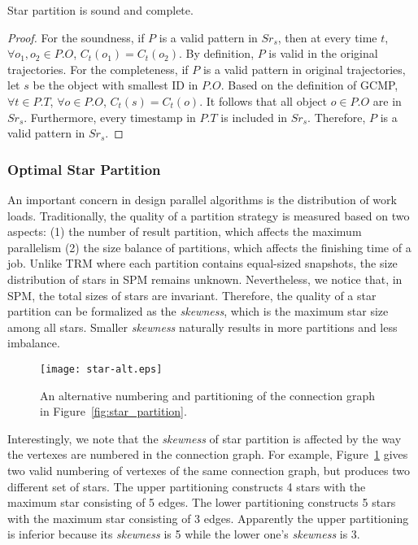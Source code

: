 \begin{theorem}
Star partition is sound and complete.
\end{theorem}

\begin{proof}
For the soundness,
if $P$ is a valid pattern in $Sr_s$, then at every time $t$, 
$\forall o_1, o_2 \in P.O$, $C_t(o_1) = C_t(o_2)$.
By definition, $P$ is valid in the original trajectories.
For the completeness,
if $P$ is a valid pattern in original trajectories, 
let $s$ be the object with smallest ID in $P.O$. 
Based on the definition of GCMP, $\forall t \in P.T$, $\forall o \in P.O$, $C_t(s) = C_t(o)$.
It follows that all object $o \in P.O$ are in $Sr_s$. 
Furthermore, every timestamp in $P.T$ is included
in $Sr_s$. Therefore, $P$ is a valid pattern in $Sr_s$.
\end{proof}


\subsubsection{Optimal Star Partition}
An important concern in design parallel algorithms is 
the distribution of work loads.  
Traditionally, the quality of a partition strategy 
is measured based on two aspects: (1) the number of result partition, which
affects the maximum parallelism
(2) the size balance of partitions, which affects the finishing
time of a job. Unlike TRM where each partition
contains equal-sized snapshots, the size distribution 
of stars in SPM remains unknown.
Nevertheless, we notice that, in SPM, the total sizes of 
stars are invariant. Therefore, the quality of a star partition
can be formalized as the \emph{skewness}, which is the maximum star size
among all stars. Smaller \emph{skewness} naturally results in more partitions
and less imbalance.


\begin{figure}[h]
\centering
\texttt{[image: star-alt.eps]}
\caption{An alternative numbering and partitioning of the connection graph in Figure~\ref{fig:star_partition}.}
\label{fig:star-alt}
\end{figure}

Interestingly, we note that the \emph{skewness} of star partition is affected by
the way the vertexes are numbered in the connection graph. For example,
Figure~\ref{fig:star-alt} gives two valid numbering of vertexes 
of the same connection graph, but produces two different set of stars. 
The upper partitioning constructs 4 stars with the maximum star consisting of 5 edges.
The lower partitioning constructs 5 stars with the maximum star consisting of 3 edges.
Apparently the upper partitioning is inferior because its \emph{skewness} is 5 while the
lower one's \emph{skewness} is 3.

